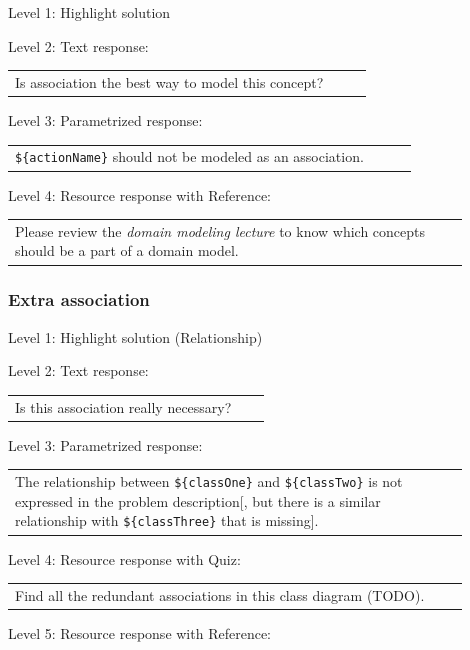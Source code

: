 \noindent Level 1: Highlight solution  \medskip

\noindent Level 2: Text response: \medskip

\begin{tabular}{|p{0.9\linewidth}}
Is association the best way to model this concept?
\end{tabular} \medskip

\noindent Level 3: Parametrized response: \medskip

\begin{tabular}{|p{0.9\linewidth}}
\verb|${actionName}| should not be modeled as an association.
\end{tabular} \medskip

\noindent Level 4: Resource response with Reference: \medskip

\begin{tabular}{|p{0.9\linewidth}}
Please review the \textit{domain modeling lecture} to know which concepts should be a part of a domain model.
\end{tabular} \medskip


\subsubsection{Extra association}

\noindent Level 1: Highlight solution (Relationship) \medskip

\noindent Level 2: Text response: \medskip

\begin{tabular}{|p{0.9\linewidth}}
Is this association really necessary?
\end{tabular} \medskip

\noindent Level 3: Parametrized response: \medskip

\begin{tabular}{|p{0.9\linewidth}}
The relationship between \verb|${classOne}| and \verb|${classTwo}| is not expressed in the problem description[, but there is a similar relationship with \verb|${classThree}| that is missing].
\end{tabular} \medskip

\noindent Level 4: Resource response with Quiz: \medskip

\begin{tabular}{|p{0.9\linewidth}}
Find all the redundant associations in this class diagram (TODO).
\end{tabular} \medskip

\noindent Level 5: Resource response with Reference: \medskip

